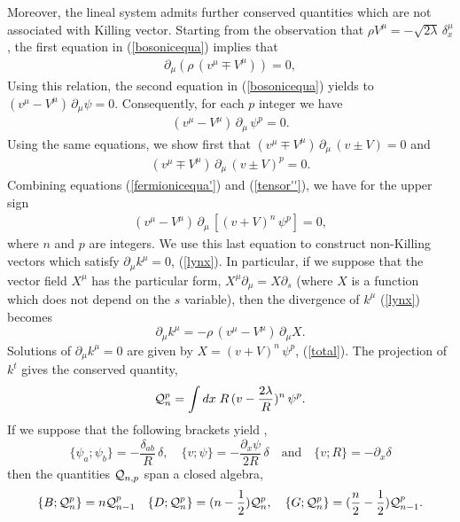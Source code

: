 \documentclass[11pt,a4paper]{article}
\begin{document}
Moreover, the lineal system admits further conserved quantities which are not associated with Killing vector. Starting from the observation that $\rho V^\mu=-\sqrt{2\lambda}\,\delta^\mu_x$, the first equation in (\ref{bosonicequa}) implies that 
\begin{eqnarray}
\partial_\mu\left(\rho\,(v^\mu\mp V^\mu)\right)=0,
\label{bosonicequa'}
\end{eqnarray}
Using this relation, the second equation in (\ref{bosonicequa}) yields to $(v^\mu-V^\mu)\,\partial_\mu\psi=0$. Consequently, for each $p$ integer we have
\begin{eqnarray}
(v^\mu-V^\mu)\,\partial_\mu\,\psi^p=0.
\label{fermionicequa'}
\end{eqnarray}
Using the same equations, we show first that $(v^\mu\mp V^\mu)\,\partial_\mu\,(v\pm V)=0$ and 
\begin{eqnarray}
(v^\mu\mp V^\mu)\,\partial_\mu\,(v\pm V)^{p}=0.
\label{tensor''}
\end{eqnarray}
Combining equations (\ref{fermionicequa'}) and (\ref{tensor''}), we have for the upper sign
\begin{eqnarray}
(v^\mu-V^\mu)\,\partial_\mu\,\left[(v+V)^n\,\psi^p\right]=0,
\label{total}
\end{eqnarray}
where $n$ and $p$ are integers. We use this last equation to construct non-Killing vectors which satisfy $\partial_\mu k^\mu=0$, (\ref{lynx}). In particular, if we suppose that the vector field $X^\mu$ has the particular form, $X^\mu\partial_\mu=X\partial_s$ (where $X$ is a function which does not depend on the $s$ variable), then the divergence of $k^\mu$ (\ref{lynx}) becomes
$$
\partial_\mu k^\mu=-\rho\,(v^\mu-V^\mu)\,\partial_\mu X.
$$
Solutions of $\partial_\mu k^\mu=0$ are given by $X=(v+V)^n\,\psi^p$, (\ref{total}). The projection of $k^t$ gives the conserved quantity,
\begin{eqnarray}
{\cal Q}_{n}^p=\int dx\;R\,(v-\frac{2\lambda}{R})^n\,\psi^p.
\label{leyleprince}
\end{eqnarray}
If we suppose that the following brackets yield \cite{JP}, 
$$
\{ \psi_a;\psi_b\}=-\frac{\delta_{ab}}{R}\,\delta ,\quad \{ v;\psi\}=-\frac{\partial_x\psi}{2R}\,\delta\quad \mbox{and}\quad \{ v;R\}=-\partial_x\delta 
$$
then the quantities ${\cal Q}_{n,p}$ span a closed algebra,
\begin{eqnarray*}
\{B;{\cal Q}_{n}^p\}=n {\cal Q}_{n-1}^p\quad \{D;{\cal Q}_{n}^p\}=(n-\frac{1}{2}) {\cal Q}_{n}^p,\quad\{G;{\cal Q}_{n}^p\}=(\frac{n}{2}-\frac{1}{2}){\cal Q}_{n-1}^p.
\end{eqnarray*}
\end{document}
